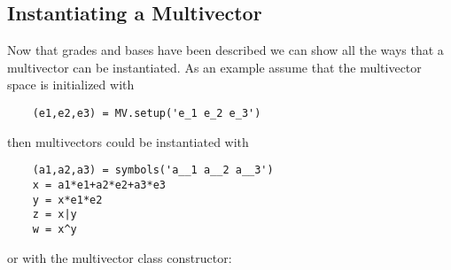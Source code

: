 \documentclass[10pt]{article}
\begin{document}
\subsection{Instantiating a Multivector}

Now that grades and bases have been described we can show all the ways that a
multivector can be instantiated. As an example assume that the multivector space
is initialized with

\begin{lstlisting}
    (e1,e2,e3) = MV.setup('e_1 e_2 e_3')
\end{lstlisting}

then multivectors could be instantiated with

\begin{lstlisting}
    (a1,a2,a3) = symbols('a__1 a__2 a__3')
    x = a1*e1+a2*e2+a3*e3
    y = x*e1*e2
    z = x|y
    w = x^y
\end{lstlisting}

or with the multivector class constructor:
\end{document}
